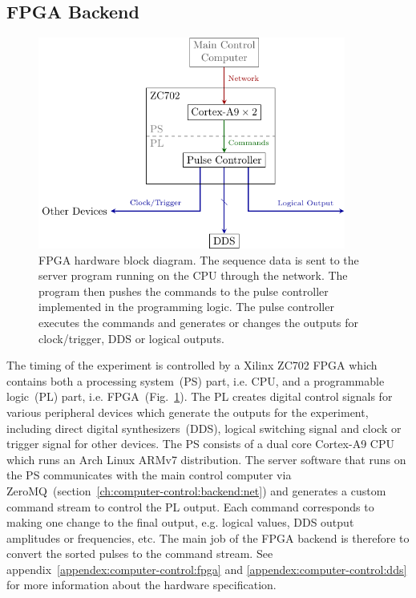 \subsection{FPGA Backend}
\label{ch:computer-control:backend:fpga}
\begin{figure}
  \centering
  \includegraphics[width=0.9\textwidth]{figures/computer_control_backend_fpga.pdf}
  \caption[FPGA Block Diagram]{
    FPGA hardware block diagram.
    The sequence data is sent to the server program running on the CPU through the network.
    The program then pushes the commands to the pulse controller implemented
    in the programming logic.
    The pulse controller executes the commands and generates or changes the outputs
    for clock/trigger, DDS or logical outputs.
    \label{fig:computer-control:backend:fpga}}
\end{figure}
The timing of the experiment is controlled by a Xilinx ZC702 FPGA
which contains both a processing system~(PS) part, i.e. CPU,
and a programmable logic~(PL) part, i.e. FPGA~(Fig.~\ref{fig:computer-control:backend:fpga}).
The PL creates digital control signals for various peripheral devices
which generate the outputs for the experiment,
including direct digital synthesizers~(DDS), logical switching signal
and clock or trigger signal for other devices.
The PS consists of a dual core Cortex-A9 CPU
which runs an Arch Linux ARMv7 distribution.
The server software that runs on the PS communicates with the main control computer
via ZeroMQ~(section~\ref{ch:computer-control:backend:net})
and generates a custom command stream to control the PL output.
Each command corresponds to making one change to the final output, e.g.
logical values, DDS output amplitudes or frequencies, etc.
The main job of the FPGA backend is therefore to convert
the sorted pulses to the command stream.
See appendix~\ref{appendex:computer-control:fpga} and \ref{appendex:computer-control:dds}
for more information about the hardware specification.

